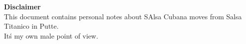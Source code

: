 \begin{center}
\textbf{Disclaimer}\\
This document contains personal notes about SAlsa Cubana moves from Salsa Titanico in Putte.\\
\noindent It\'s my own male point of view.
\end{center}
